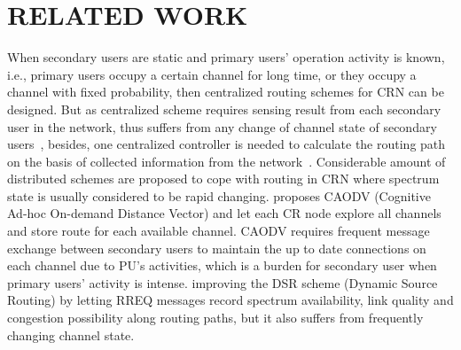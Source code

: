 \section{RELATED WORK}
When secondary users are static and primary users' operation activity is known, i.e., primary users occupy a certain channel for long time, or they occupy a channel with fixed probability, then centralized routing schemes for CRN can be designed\cite{centralized_routing_07dyspan}.
But as centralized scheme requires sensing result from each secondary user in the network, thus suffers from any change of channel state of secondary users~\cite{Abbagnale_Gymkhana10}, besides, one centralized controller is needed to calculate the routing path on the basis of collected information from the network~\cite{centralized_routing_07dyspan, Routing-crn-INFOCOM11}.
Considerable amount of distributed schemes are proposed to cope with routing in CRN where spectrum state is usually considered to be rapid changing.
\cite{caodv-10wd} proposes CAODV (Cognitive Ad-hoc On-demand Distance Vector) and let each CR node explore all channels and store route for each available channel.
CAODV requires frequent message exchange between secondary users to maintain the up to date connections on each channel due to PU's activities, which is a burden for secondary user when primary users' activity is intense. 
\cite{segment-crowncom08} improving the DSR scheme (Dynamic Source Routing) by letting RREQ messages record spectrum availability, link quality and congestion possibility along routing paths, but it also suffers from frequently changing channel state.

